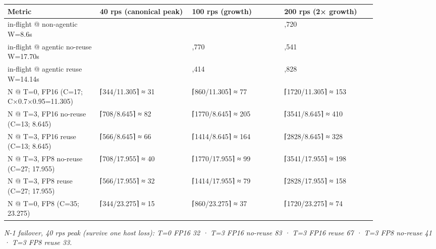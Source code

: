 \nopagebreak[4]
\begin{longtable}[]{@{}
  >{\raggedright\arraybackslash}p{0.2127\linewidth}
  >{\raggedright\arraybackslash}p{0.2127\linewidth}
  >{\raggedright\arraybackslash}p{0.2127\linewidth}
  >{\raggedright\arraybackslash}p{0.2127\linewidth}@{}}
\toprule\noalign{}
\begin{minipage}[b]{\linewidth}\raggedright
Metric
\end{minipage} & \begin{minipage}[b]{\linewidth}\raggedright
40 rps (canonical peak)
\end{minipage} & \begin{minipage}[b]{\linewidth}\raggedright
100 rps (growth)
\end{minipage} & \begin{minipage}[b]{\linewidth}\raggedright
200 rps (2× growth)
\end{minipage} \\
\midrule\noalign{}
\endhead
\bottomrule\noalign{}
\endlastfoot
in-flight @ non-agentic W=8.6s & 344 & 860 & 1,720 \\
\noalign{\label{tab:17.2}}
in-flight @ agentic no-reuse W=17.70s & 708 & 1,770 & 3,541 \\
in-flight @ agentic reuse W=14.14s & 566 & 1,414 & 2,828 \\
N @ T=0, FP16 (C=17; C×0.7×0.95=11.305) & ⌈344/11.305⌉ ≈ 31 &
⌈860/11.305⌉ ≈ 77 & ⌈1720/11.305⌉ ≈ 153 \\
N @ T=3, FP16 no-reuse (C=13; 8.645) & ⌈708/8.645⌉ ≈ 82 & ⌈1770/8.645⌉ ≈
205 & ⌈3541/8.645⌉ ≈ 410 \\
N @ T=3, FP16 reuse (C=13; 8.645) & ⌈566/8.645⌉ ≈ 66 & ⌈1414/8.645⌉ ≈
164 & ⌈2828/8.645⌉ ≈ 328 \\
N @ T=3, FP8 no-reuse (C=27; 17.955) & ⌈708/17.955⌉ ≈ 40 & ⌈1770/17.955⌉
≈ 99 & ⌈3541/17.955⌉ ≈ 198 \\
N @ T=3, FP8 reuse (C=27; 17.955) & ⌈566/17.955⌉ ≈ 32 & ⌈1414/17.955⌉ ≈
79 & ⌈2828/17.955⌉ ≈ 158 \\
N @ T=0, FP8 (C=35; 23.275) & ⌈344/23.275⌉ ≈ 15 & ⌈860/23.275⌉ ≈ 37 &
⌈1720/23.275⌉ ≈ 74 \\
\end{longtable}

\emph{N-1 failover, 40 rps peak (survive one host loss): T=0 FP16 32 ·
T=3 FP16 no-reuse 83 · T=3 FP16 reuse 67 · T=3 FP8 no-reuse 41 · T=3 FP8
reuse 33.}

